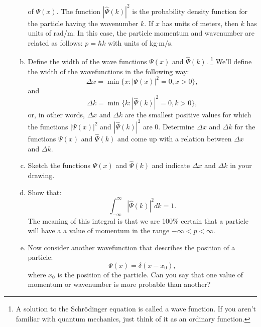 \begin{enumerate}
\begin{enumerate}[a)]
{} of $\Psi(x)$. The function $|\hat{\Psi}(k)|^{2}$ is the probability
density function for the particle having the wavenumber $k$. If $x$
has units of meters, then $k$ has units of rad/m. In this case, the
particle momentum and wavenumber are related as follows:
$p = \hbar k$ with units of kg$\cdot$m$/$s.

\item Define the width of the wave functions $\Psi(x)$ and $\hat{\Psi}(k)$.
\footnote{A solution to the Schrödinger equation is called a wave function. If you aren't familiar with quantum mechanics, just think of it as an ordinary function.} We'll define the width of the wavefunctions in the following way:
$$\Delta x = \min\{x : |\Psi(x)|^{2}=0,x>0\},$$
and 
$$\Delta k = \min\{k : |\hat{\Psi}(k)|^{2}=0,k>0\},$$
or, in other words, $\Delta x$ and $\Delta k$ are the smallest positive values for which the functions $|\Psi(x)|^{2}$ and $|\hat{\Psi}(k)|^{2}$ are $0$. Determine $\Delta x$ and $\Delta k$ for the functions $\Psi(x)$ and $\hat{\Psi}(k)$ and come up with a relation between $\Delta x$ and $\Delta k$.

\item Sketch the functions $\Psi(x)$ and $\hat{\Psi}(k)$ and indicate $\Delta x$ and $\Delta k$ in your drawing. 

\item Show that:
$$\int_{-\infty}^{\infty} |\hat{\Psi}(k)|^{2}dk=1.$$ The meaning of this
integral is that we are 100\% certain that a particle will have a
a value of momentum in the range $-\infty<p<\infty$.

\item Now consider another wavefunction that describes the position of a particle:
\begin{equation}
\Psi(x) = \delta(x-x_0),
\end{equation}
where $x_0$ is the position of the particle. Can you say that one
value of momentum or wavenumber is more probable than another?

\end{enumerate}



\end{enumerate}
